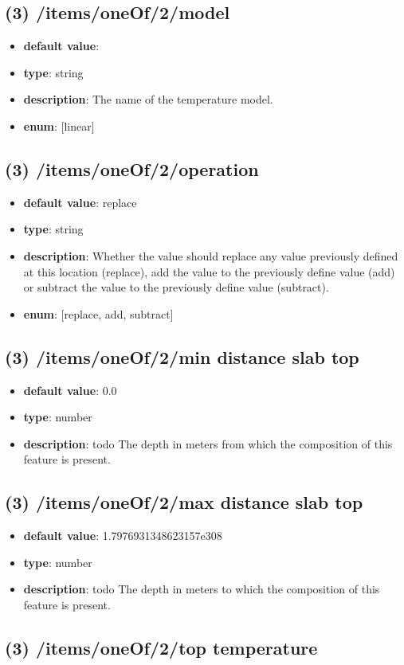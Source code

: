 \subsection{(3) /items/oneOf/2/model}
\begin{itemize}[leftmargin=3em]\item {\bf default value}: 
\item {\bf type}: string
\item {\bf description}: The name of the temperature model.
\item {\bf enum}: [linear]\end{itemize}\subsection{(3) /items/oneOf/2/operation}
\begin{itemize}[leftmargin=3em]\item {\bf default value}: replace
\item {\bf type}: string
\item {\bf description}: Whether the value should replace any value previously defined at this location (replace), add the value to the previously define value (add) or subtract the value to the previously define value (subtract).
\item {\bf enum}: [replace, add, subtract]\end{itemize}\subsection{(3) /items/oneOf/2/min distance slab top}
\begin{itemize}[leftmargin=3em]\item {\bf default value}: 0.0
\item {\bf type}: number
\item {\bf description}: todo The depth in meters from which the composition of this feature is present.
\end{itemize}\subsection{(3) /items/oneOf/2/max distance slab top}
\begin{itemize}[leftmargin=3em]\item {\bf default value}: 1.7976931348623157e308
\item {\bf type}: number
\item {\bf description}: todo The depth in meters to which the composition of this feature is present.
\end{itemize}\subsection{(3) /items/oneOf/2/top temperature}
